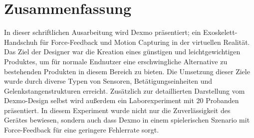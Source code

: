 \chapter*{Zusammenfassung}
In dieser schriftlichen Ausarbeitung wird Dexmo präsentiert; ein Exoskelett-Handschuh für Force-Feedback und Motion Capturing in der virtuellen Realität. Das Ziel der Designer war die Kreation eines günstigen und leichtgewichtigen Produktes, um für normale Endnutzer eine erschwingliche Alternative zu bestehenden Produkten in diesem Bereich zu bieten. Die Umsetzung dieser Ziele wurde durch diverse Typen von Sensoren, Betätigungseinheiten und Gelenkstangenstrukturen erreicht. Zusätzlich zur detaillierten Darstellung vom Dexmo-Design selbst wird außerdem ein Laborexperiment mit 20 Probanden präsentiert. In diesem Experiment wurde nicht nur die Zuverlässigkeit des Gerätes bewiesen, sondern auch dass Dexmo in einem spielerischen Szenario mit Force-Feedback für eine geringere Fehlerrate sorgt.
